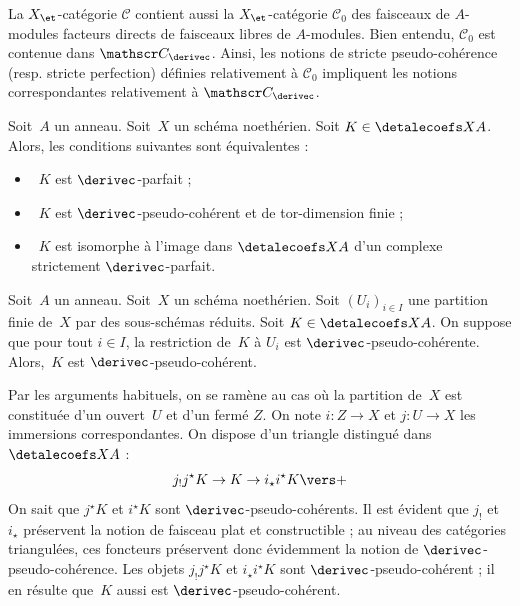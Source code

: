 \documentclass[10pt]{../fichiers-configuration-latex/smfart}
\begin{document}
\begin{remarque2}
La $X_\et$-catégorie $\mathscr C$ contient aussi la $X_\et$-catégorie
$\mathscr C_0$ des faisceaux de $A$-modules facteurs directs de faisceaux
libres de $A$-modules. Bien entendu, $\mathscr C_0$ est contenue dans
$\mathscr C_{\derivec}$. Ainsi, les notions de stricte pseudo-cohérence (resp.
stricte perfection) définies relativement à $\mathscr C_0$ impliquent
les notions correspondantes relativement à $\mathscr C_\derivec$.
\end{remarque2}

\begin{proposition2}\label{17-proposition-critete-c-perfection}
Soit $A$ un anneau. Soit $X$ un schéma noethérien.
Soit $K\in \detalecoefs X A$. Alors, les conditions suivantes sont équivalentes
:
\begin{itemize}
\item[(i)] $K$ est $\derivec$-parfait ;
\item[(ii)] $K$ est $\derivec$-pseudo-cohérent et de tor-dimension finie ;
\item[(iii)] $K$ est isomorphe à l'image dans $\detalecoefs X A$ d'un complexe
strictement $\derivec$-parfait.
\end{itemize}
\end{proposition2}

\begin{lemme2}
Soit $A$ un anneau. Soit $X$ un schéma noethérien. Soit $(U_i)_{i\in I}$
une partition finie de $X$ par des sous-schémas réduits. Soit $K\in
\detalecoefs X
A$. On suppose que pour tout $i\in I$, la restriction de $K$ à $U_i$
est $\derivec$-pseudo-cohérente. Alors, $K$ est $\derivec$-pseudo-cohérent.
\end{lemme2}

Par les arguments habituels, on se ramène au cas où la partition de $X$ est
constituée d'un ouvert $U$ et d'un fermé $Z$. On note $i\colon Z\to X$ et
$j\colon U\to X$ les immersions correspondantes. On dispose d'un triangle
distingué dans $\detalecoefs X A$ :
\[j_!j^\star K\to K\to i_\star i^\star K\vers +\]
On sait que $j^\star K$ et $i^\star K$ sont $\derivec$-pseudo-cohérents.
Il est
évident que $j_!$ et $i_\star$ préservent la notion de faisceau plat et
constructible ; au niveau des catégories triangulées, ces foncteurs
préservent donc évidemment la notion de $\derivec$-pseudo-cohérence. Les objets
$j_!j^\star K$ et $i_\star i^\star K$ sont $\derivec$-pseudo-cohérent ;
il en résulte que $K$ aussi est $\derivec$-pseudo-cohérent.
\end{document}
